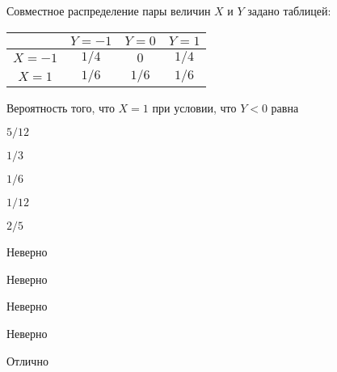 
\begin{question}
Совместное распределение пары величин \(X\) и \(Y\) задано таблицей:

\begin{tabular}{@{}c|ccc@{}}
\toprule
       & $Y=-1$ & $Y=0$ & $Y=1$ \\ \midrule
$X=-1$ & $1/4$  & $0$   & $1/4$ \\
$X=1$  & $1/6$  & $1/6$ & $1/6$ \\ \bottomrule
\end{tabular}

\vspace{0.5cm}

Вероятность того, что \(X=1\) при условии, что \(Y<0\) равна
\begin{answerlist}
  \item \(5/12\)
  \item \(1/3\)
  \item \(1/6\)
  \item \(1/12\)
  \item \(2/5\)
\end{answerlist}
\end{question}

\begin{solution}
\begin{answerlist}
  \item Неверно
  \item Неверно
  \item Неверно
  \item Неверно
  \item Отлично
\end{answerlist}
\end{solution}

